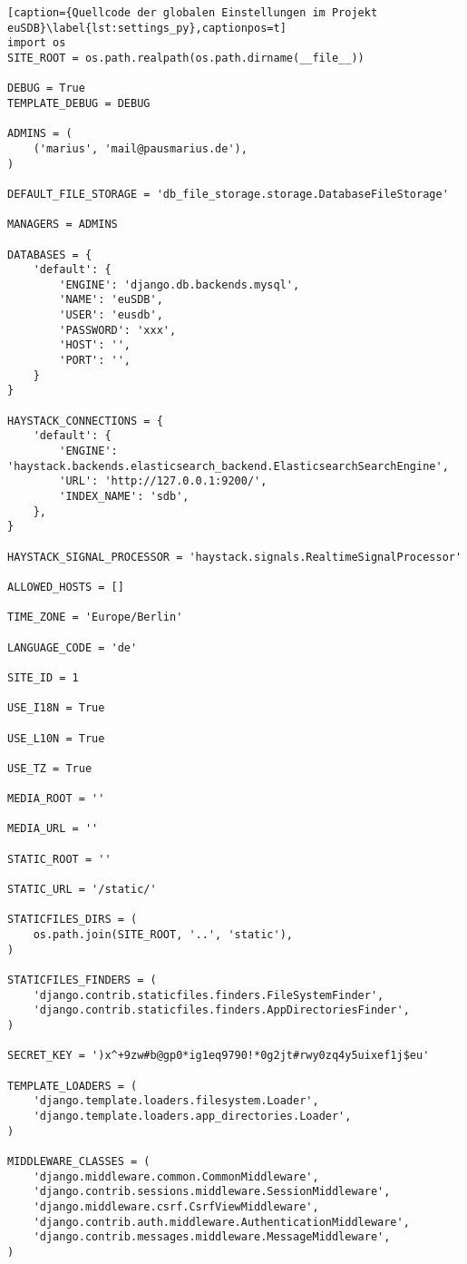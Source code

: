 \begin{lstlisting}[caption={Quellcode der globalen Einstellungen im Projekt
euSDB}\label{lst:settings_py},captionpos=t]
import os
SITE_ROOT = os.path.realpath(os.path.dirname(__file__))

DEBUG = True
TEMPLATE_DEBUG = DEBUG

ADMINS = (
    ('marius', 'mail@pausmarius.de'),
)

DEFAULT_FILE_STORAGE = 'db_file_storage.storage.DatabaseFileStorage'

MANAGERS = ADMINS

DATABASES = {
    'default': {
        'ENGINE': 'django.db.backends.mysql',
        'NAME': 'euSDB',
        'USER': 'eusdb',
        'PASSWORD': 'xxx',
        'HOST': '',
        'PORT': '',
    }
}

HAYSTACK_CONNECTIONS = {
    'default': {
        'ENGINE': 'haystack.backends.elasticsearch_backend.ElasticsearchSearchEngine',
        'URL': 'http://127.0.0.1:9200/',
        'INDEX_NAME': 'sdb',
    },
}

HAYSTACK_SIGNAL_PROCESSOR = 'haystack.signals.RealtimeSignalProcessor'

ALLOWED_HOSTS = []

TIME_ZONE = 'Europe/Berlin'

LANGUAGE_CODE = 'de'

SITE_ID = 1

USE_I18N = True

USE_L10N = True

USE_TZ = True

MEDIA_ROOT = ''

MEDIA_URL = ''

STATIC_ROOT = ''

STATIC_URL = '/static/'

STATICFILES_DIRS = (
    os.path.join(SITE_ROOT, '..', 'static'),    
)

STATICFILES_FINDERS = (
    'django.contrib.staticfiles.finders.FileSystemFinder',
    'django.contrib.staticfiles.finders.AppDirectoriesFinder',
)

SECRET_KEY = ')x^+9zw#b@gp0*ig1eq9790!*0g2jt#rwy0zq4y5uixef1j$eu'

TEMPLATE_LOADERS = (
    'django.template.loaders.filesystem.Loader',
    'django.template.loaders.app_directories.Loader',
)

MIDDLEWARE_CLASSES = (
    'django.middleware.common.CommonMiddleware',
    'django.contrib.sessions.middleware.SessionMiddleware',
    'django.middleware.csrf.CsrfViewMiddleware',
    'django.contrib.auth.middleware.AuthenticationMiddleware',
    'django.contrib.messages.middleware.MessageMiddleware',
)


\end{lstlisting}
